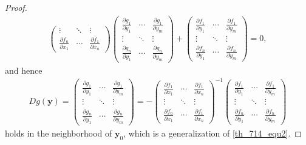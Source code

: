 \documentclass[11pt]{book}
\theoremstyle{definition}
\numberwithin{equation}{chapter}
\begin{document}
\begin{proof}
\begin{align*}
\begin{pmatrix}
        \vdots & \ddots & \vdots \\
        \frac{\partial f_n}{\partial x_1} & \cdots & \frac{\partial f_1}{\partial x_n}
    \end{pmatrix} 
    \begin{pmatrix}
        \frac{\partial g_1}{\partial y_1} & \cdots & \frac{\partial g_1}{\partial y_m} \\
        \vdots & \ddots & \vdots \\
        \frac{\partial g_n}{\partial y_1} & \cdots & \frac{\partial g_n}{\partial y_m}
    \end{pmatrix} + 
    \begin{pmatrix}
        \frac{\partial f_1}{\partial y_1} & \cdots & \frac{\partial f_1}{\partial y_m} \\
        \vdots & \ddots & \vdots \\
        \frac{\partial f_n}{\partial y_1} & \cdots & \frac{\partial f_n}{\partial y_m}
    \end{pmatrix} = 0,
\end{align*}
and hence
\begin{align*}
    Dg(\mathbf{y}) = \begin{pmatrix}
        \frac{\partial g_1}{\partial y_1} & \cdots & \frac{\partial g_1}{\partial y_m} \\
        \vdots & \ddots & \vdots \\
        \frac{\partial g_n}{\partial y_1} & \cdots & \frac{\partial g_n}{\partial y_m}
    \end{pmatrix} = - \begin{pmatrix}
        \frac{\partial f_1}{\partial x_1} & \cdots & \frac{\partial f_1}{\partial x_n} \\
        \vdots & \ddots & \vdots \\
        \frac{\partial f_n}{\partial x_1} & \cdots & \frac{\partial f_1}{\partial x_n}
    \end{pmatrix}^{-1} \begin{pmatrix}
        \frac{\partial f_1}{\partial y_1} & \cdots & \frac{\partial f_1}{\partial y_m} \\
        \vdots & \ddots & \vdots \\
        \frac{\partial f_n}{\partial y_1} & \cdots & \frac{\partial f_n}{\partial y_m}
    \end{pmatrix}
\end{align*}
holds in the neighborhood of $\mathbf{y}_0$, which is a generalization of \eqref{th_714_equ2}.
\end{proof}
\end{document}
